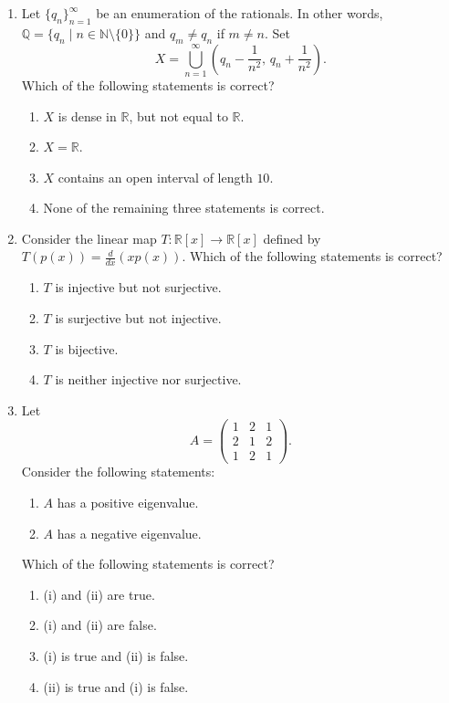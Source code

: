 \documentclass[11pt, a4paper]{article}
\begin{document}
\begin{enumerate}
  \item Let $\{q_n\}_{n=1}^\infty$ be an enumeration of the rationals. In other words, $\mathbb{Q} = \{q_n \mid n \in \mathbb{N} \setminus \{0\}\}$ and $q_m \ne q_n$ if $m \ne n$. Set
  \[
    X = \bigcup_{n=1}^\infty \left(q_n - \frac{1}{n^2}, \, q_n + \frac{1}{n^2}\right).
  \]
  Which of the following statements is correct?
  \begin{enumerate}[label=(\alph*)]
    \item $X$ is dense in $\mathbb{R}$, but not equal to $\mathbb{R}$.
    \item $X = \mathbb{R}$.
    \item $X$ contains an open interval of length $10$.
    \item None of the remaining three statements is correct.
  \end{enumerate}

  \item Consider the linear map $T: \mathbb{R}[x] \to \mathbb{R}[x]$ defined by $T(p(x)) = \frac{d}{dx}(x p(x))$. Which of the following statements is correct?
  \begin{enumerate}[label=(\alph*)]
    \item $T$ is injective but not surjective.
    \item $T$ is surjective but not injective.
    \item $T$ is bijective.
    \item $T$ is neither injective nor surjective.
  \end{enumerate}

  \item Let
  \[
    A = \begin{pmatrix} 1 & 2 & 1 \\ 2 & 1 & 2 \\ 1 & 2 & 1 \end{pmatrix}.
  \]
  Consider the following statements:
  \begin{enumerate}[label=(\roman*)]
    \item $A$ has a positive eigenvalue.
    \item $A$ has a negative eigenvalue.
  \end{enumerate}
  Which of the following statements is correct?
  \begin{enumerate}[label=(\alph*)]
    \item (i) and (ii) are true.
    \item (i) and (ii) are false.
    \item (i) is true and (ii) is false.
    \item (ii) is true and (i) is false.
  \end{enumerate}


\end{enumerate}
\end{document}
